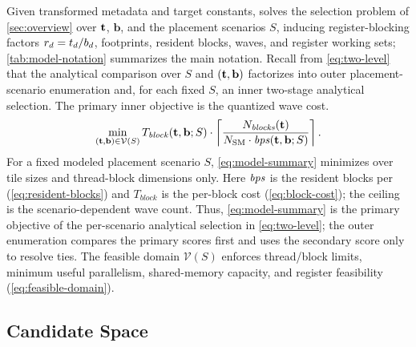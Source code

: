 Given transformed metadata and target constants, \name solves the selection problem of \autoref{sec:overview} over \(\mathbf{t}\), \(\mathbf{b}\), and the placement scenarios \(S\), inducing register-blocking factors \(r_d=t_d/b_d\), footprints, resident blocks, waves, and register working sets; \autoref{tab:model-notation} summarizes the main notation. Recall from \autoref{eq:two-level} that the analytical comparison over \(S\) and \((\mathbf{t},\mathbf{b})\) factorizes into outer placement-scenario enumeration and, for each fixed \(S\), an inner two-stage analytical selection. The primary inner objective is the quantized wave cost.
\begin{equation}
\min_{(\mathbf{t},\mathbf{b})\in\mathcal{V}(S)}
T_{\mathit{block}}(\mathbf{t},\mathbf{b};S)
\cdot
\left\lceil
\dfrac{N_{\mathit{blocks}}(\mathbf{t})}
      {N_{\mathrm{SM}} \cdot \mathit{bps}(\mathbf{t},\mathbf{b};S)}
\right\rceil.
\label{eq:model-summary}
\end{equation}
For a fixed modeled placement scenario \(S\), \autoref{eq:model-summary} minimizes over tile sizes and thread-block dimensions only. Here \(\mathit{bps}\) is the resident blocks per \sm (\autoref{eq:resident-blocks}) and \(T_{\mathit{block}}\) is the per-block cost (\autoref{eq:block-cost}); the ceiling is the scenario-dependent wave count. Thus, \autoref{eq:model-summary} is the primary objective of the per-scenario analytical selection in \autoref{eq:two-level}; the outer enumeration compares the primary scores first and uses the secondary score only to resolve ties. The feasible domain \(\mathcal{V}(S)\) enforces thread/block limits, minimum useful parallelism, shared-memory capacity, and register feasibility (\autoref{eq:feasible-domain}).

\subsection{Candidate Space}
\label{sec:abstraction}
\label{sec:placement}

